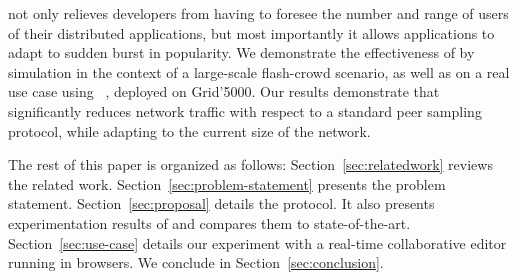 \SPRAY not only relieves developers from having to foresee the number
and range of users of their distributed applications, but most
importantly it allows applications to adapt to sudden burst in
popularity. We demonstrate the effectiveness of \SPRAY by simulation
in the context of a large-scale flash-crowd scenario, as well as on a
real use case using \CRATE~\cite{nedelec2016crate}, deployed on
Grid'5000. Our results demonstrate that \SPRAY significantly reduces
network traffic with respect to a standard peer sampling protocol,
while adapting to the current size of the network. 


The rest of this paper is organized as follows: Section~\ref{sec:relatedwork}
reviews the related work. Section~\ref{sec:problem-statement} presents
the problem statement. Section~\ref{sec:proposal} details the \SPRAY
protocol. It also presents experimentation results of \SPRAY and compares them
to state-of-the-art. Section~\ref{sec:use-case} details our experiment with
\CRATE a real-time collaborative editor running in browsers. We conclude in
Section~\ref{sec:conclusion}.

